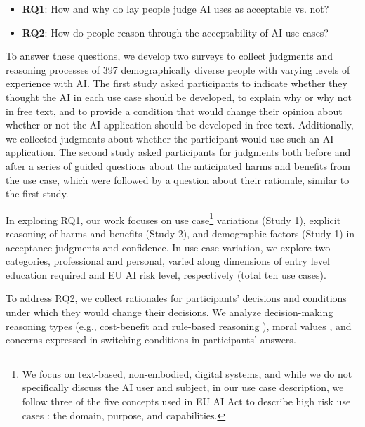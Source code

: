 \begin{itemize}
    \item \textbf{RQ1}: How and why do lay people judge AI uses as acceptable vs. not?
    \item \textbf{RQ2}: How do people reason through the acceptability of AI use cases?
\end{itemize}
To answer these questions, we develop two surveys to collect judgments and reasoning processes of 397 demographically diverse people with varying levels of experience with AI. The first study asked participants to indicate whether they thought the AI in each use case should be developed, to explain why or why not in free text, and to provide a condition that would change their opinion about whether or not the AI application should be developed in free text. Additionally, we collected judgments about whether the participant would use such an AI application. The second study asked participants for judgments both before and after a series of guided questions about the anticipated harms and benefits from the use case,  which were followed by a question about their rationale, similar to the first study.

In exploring RQ1, our work focuses on use case\footnote{We focus on text-based, non-embodied, digital systems, and while we do not specifically discuss the AI user and subject, in our use case description, we follow three of the five concepts used in EU AI Act to describe high risk use cases \citep{golpayegani2023risk}: the domain, purpose, and capabilities.} variations (Study 1), explicit reasoning of harms and benefits (Study 2), and demographic factors (Study 1) in acceptance judgments and confidence. In use case variation, we explore two categories, professional and personal, varied along dimensions of entry level education required and EU AI risk level, respectively (total ten use cases). 

To address RQ2, we collect rationales for participants' decisions and conditions under which they would change their decisions. We analyze decision-making reasoning types (e.g., cost-benefit and rule-based reasoning \citep{}), moral values \citep{}, and concerns expressed in switching conditions in participants' answers. 



